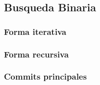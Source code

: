 \subsection{Busqueda Binaria}
\subsubsection{Forma iterativa}

\subsubsection{Forma recursiva}

\subsubsection{Commits principales}
